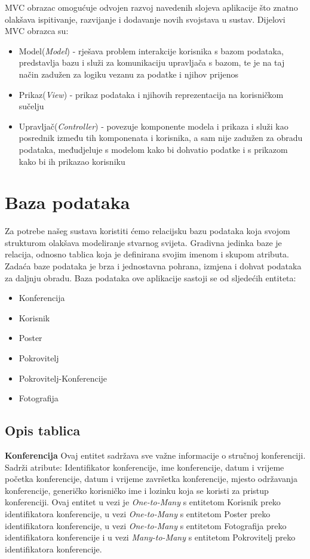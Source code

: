 \indent MVC obrazac omogućuje odvojen razvoj navedenih slojeva aplikacije što znatno olakšava ispitivanje, razvijanje i dodavanje novih svojstava u sustav.
\newline
Dijelovi MVC obrazca su:
\begin{itemize}
	\item Model(\textit{Model}) - rješava problem interakcije korisnika s bazom podataka, predstavlja bazu i služi za komunikaciju upravljača s bazom, te je na taj način zadužen za logiku vezanu za podatke i njihov prijenos
	\item Prikaz(\textit{View}) - prikaz podataka i njihovih reprezentacija na korisničkom sučelju
	\item Upravljač(\textit{Controller}) - povezuje komponente modela i prikaza i služi kao posrednik između tih komponenata i korisnika, a sam nije zadužen za obradu podataka, međudjeluje s modelom kako bi dohvatio podatke i s prikazom kako bi ih prikazao korisniku
\end{itemize}

		\section{Baza podataka}
			
		Za potrebe našeg sustava koristiti ćemo relacijsku bazu podataka koja svojom strukturom olakšava modeliranje stvarnog svijeta. Gradivna jedinka baze je relacija, odnosno tablica koja je definirana svojim imenom i skupom atributa. Zadaća baze podataka je brza i jednostavna pohrana, izmjena i dohvat podataka za daljnju obradu.
		Baza podataka ove aplikacije sastoji se od sljedećih entiteta: 
		
		\begin{itemize}
			\item Konferencija
			\item Korisnik
			\item Poster
			\item Pokrovitelj
			\item Pokrovitelj-Konferencije
			\item Fotografija
		\end{itemize}
		
			\subsection{Opis tablica}
				
				\noindent\textbf{Konferencija } Ovaj entitet sadržava sve važne informacije o stručnoj konferenciji. Sadrži atribute: Identifikator konferencije, ime konferencije, datum i vrijeme početka konferencije, datum i vrijeme završetka konferencije, mjesto održavanja konferencije, generičko korisničko ime i lozinku koja se koristi za pristup konferenciji. Ovaj entitet u vezi je \textit{One-to-Many} s entitetom Korisnik preko identifikatora konferencije, u vezi \textit{One-to-Many} s entitetom Poster preko identifikatora konferencije, u vezi \textit{One-to-Many} s entitetom Fotografija preko identifikatora konferencije i u vezi \textit{Many-to-Many} s entitetom Pokrovitelj preko identifikatora konferencije. 
				
